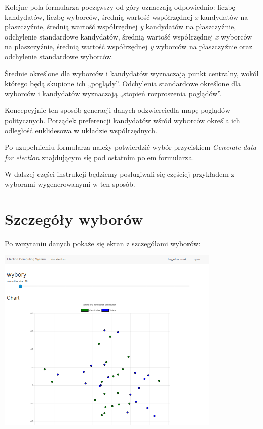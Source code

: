 \documentclass[pdflatex,11pt]{../aghdoc_version2}
\begin{document}
\vspace{\baselineskip}
Kolejne pola formularza począwszy od góry oznaczają odpowiednio: liczbę kandydatów, liczbę wyborców, średnią wartość współrzędnej \textit{x} kandydatów na płaszczyźnie, średnią wartość współrzędnej \textit{y} kandydatów na płaszczyźnie, odchylenie standardowe kandydatów, średnią wartość współrzędnej \textit{x} wyborców na płaszczyźnie, średnią wartość współrzędnej \textit{y} wyborców na płaszczyźnie oraz odchylenie standardowe wyborców.

Średnie określone dla wyborców i kandydatów wyznaczają punkt centralny, wokół którego będą skupione ich „poglądy”.  Odchylenia standardowe określone dla wyborców i kandydatów wyznaczają „stopień rozproszenia poglądów”.

Koncepcyjnie ten sposób generacji danych odzwierciedla mapę poglądów politycznych. Porządek preferencji kandydatów wśród wyborców określa ich odległość euklidesowa w układzie współrzędnych.

Po uzupełnieniu formularza należy potwierdzić wybór przyciskiem \textit{Generate data for election} znajdującym się pod ostatnim polem formularza.

W dalszej części instrukcji będziemy posługiwali się częściej przykładem z wyborami wygenerowanymi w ten sposób.
\newpage


\section{Szczegóły wyborów}
\label{sec:szczegolywyborow}

Po wczytaniu danych pokaże się ekran z szczegółami wyborów: \\
\begin{center}
\includegraphics[width=0.8\textwidth]{pics/newlycreated_version2.png}
\end{center}
\end{document}
